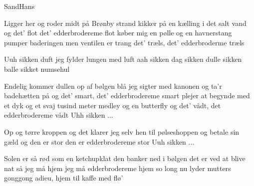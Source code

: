 \begin{sang}{SandHans}{}
\begin{vers}
Ligger her og roder midt på
Brønby strand kikker på en kælling
i det salt vand og det' flot
det' edderbrodereme flot
køber mig en pølle og en havnerstang
pumper baderingen men ventilen er trang
det' træls, det' edderbroderme træls
\end{vers}
\begin{omkvaed}
Uuh sikken duft
jeg fylder lungen med luft
aah sikken dag
sikken dulle sikken balle sikket numsehul
\end{omkvaed}
\begin{vers}
Endelig kommer dullen op af bølgen blå
jeg sigter med kanonen
og ta'r badehætten på
og det' smart, det' edderbrodereme smart
plejer at begynde med et dyk og et svaj
tusind meter medley og en butterfly
og det' vådt, det edderbrodereme vådt
Uhh sikken ...
\end{vers}

\begin{vers}
Op og tørre kroppen
og det klarer jeg selv
hen til pølseshoppen og betale sin gæld
og den er stor
den er edderbrodereme stor
Uuh sikken ...
\end{vers}


\begin{vers}
Solen er så rød som en ketchupklat
den banker ned i bølgen
det er ved at blive nat
så jeg må hjem
jeg må edderbrodereme hjem
so long nu lyder mutters gonggong
adieu, hjem til kaffe med flø'
\end{vers}
\laps
\end{sang}